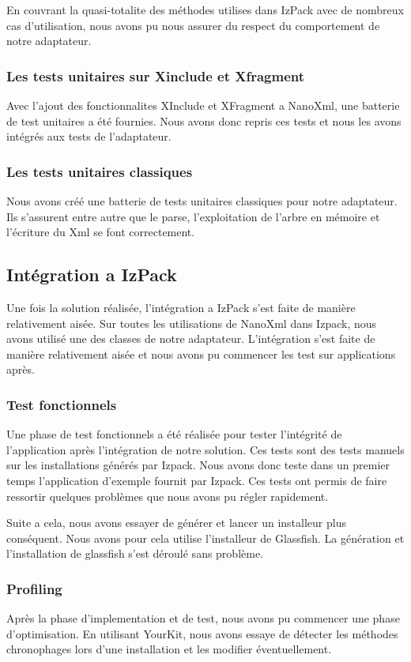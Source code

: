En couvrant la quasi-totalite des méthodes utilises dans IzPack avec de nombreux cas d'utilisation, nous avons pu nous assurer du respect du comportement de notre adaptateur.
\subsubsection{Les tests unitaires sur Xinclude et Xfragment}
Avec l'ajout des fonctionnalites XInclude et XFragment a NanoXml, une batterie de test unitaires a été fournies. Nous avons donc repris ces tests et nous les avons intégrés aux tests de l'adaptateur. 
\subsubsection{Les tests unitaires classiques}
Nous avons créé une batterie de tests unitaires classiques pour notre adaptateur. Ils s'assurent entre autre que le parse, l'exploitation de l'arbre en mémoire et l'écriture du Xml se font correctement.
\subsection{Intégration a IzPack}
Une fois la solution réalisée, l'intégration a IzPack s'est faite de manière relativement aisée. Sur toutes les utilisations de NanoXml dans Izpack, nous avons utilisé une des classes de notre adaptateur. L'intégration s'est faite de manière relativement aisée et nous avons pu commencer les test sur applications après.
\subsubsection{Test fonctionnels}
Une phase de test fonctionnels a été réalisée pour tester l'intégrité de l'application après l'intégration de notre solution. Ces tests sont des tests manuels sur les installations générés par Izpack. Nous avons donc teste dans un premier temps l'application d'exemple fournit par Izpack. Ces tests ont permis de faire ressortir quelques problèmes que nous avons pu régler rapidement.

Suite a cela, nous avons essayer de générer et lancer un installeur plus conséquent. Nous avons pour cela utilise l'installeur de Glassfish. La génération et l'installation de glassfish s'est déroulé sans problème.
\subsubsection{Profiling}
Après la phase d'implementation et de test, nous avons pu commencer une phase d'optimisation. En utilisant YourKit, nous avons essaye de détecter les méthodes chronophages lors d'une installation et les modifier éventuellement.
